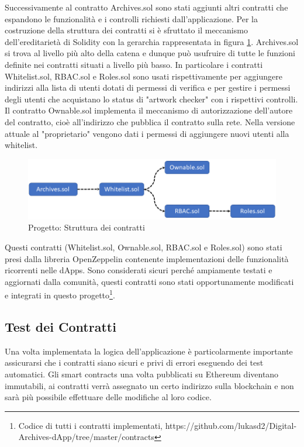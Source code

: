 Successivamente al contratto Archives.sol sono stati aggiunti altri contratti che espandono le funzionalità e i controlli richiesti dall'applicazione. Per la costruzione della struttura dei contratti si è sfruttato il meccanismo dell'ereditarietà di Solidity con la gerarchia rappresentata in figura \ref{fig:contractStructure}. Archives.sol si trova al livello più alto della catena e dunque può usufruire di tutte le funzioni definite nei contratti situati a livello più basso. In particolare i contratti Whitelist.sol, RBAC.sol e Roles.sol sono usati rispettivamente per aggiungere indirizzi alla lista di utenti dotati di permessi di verifica e per gestire i permessi degli utenti che acquistano lo status di "artwork checker" con i rispettivi controlli.
Il contratto Ownable.sol implementa il meccanismo di autorizzazione dell'autore del contratto, cioè all'indirizzo che pubblica il contratto sulla rete. Nella versione attuale al "proprietario" vengono dati i permessi di aggiungere nuovi utenti alla whitelist. 

\begin{figure}[H]
\centering
\includegraphics[width=1\textwidth]{immagini/contractStructure.png}
\caption{Progetto: Struttura dei contratti}
\label{fig:contractStructure}
\end{figure}

Questi contratti (Whitelist.sol, Ownable.sol, RBAC.sol e Roles.sol) sono stati presi dalla libreria OpenZeppelin contenente implementazioni delle funzionalità ricorrenti nelle dApps. Sono considerati sicuri perché ampiamente testati e aggiornati dalla comunità, questi contratti sono stati opportunamente modificati e integrati in questo progetto{\footnote{Codice di tutti i contratti implementati, https://github.com/lukasd2/Digital-Archives-dApp/tree/master/contracts}}.

\subsection{Test dei Contratti}

Una volta implementata la logica dell'applicazione è particolarmente importante assicurarsi che i contratti siano sicuri e privi di errori eseguendo dei test automatici. Gli smart contracts una volta pubblicati su Ethereum diventano immutabili, ai contratti verrà assegnato un certo indirizzo sulla blockchain e non sarà più possibile effettuare delle modifiche al loro codice. 

